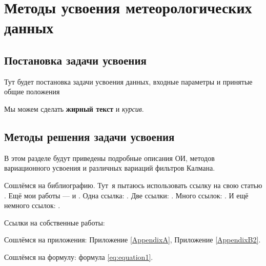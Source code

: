 \chapter{Методы усвоения метеорологических данных} \label{chapt1}

\section{Постановка задачи усвоения} \label{sect1_1}
Тут будет постановка задачи усвоения данных, входные параметры и принятые общие положения

Мы можем сделать \textbf{жирный текст} и \textit{курсив}.

\section{Методы решения задачи усвоения} \label{sect1_2}

В этом разделе будут приведены подробные описания ОИ, методов вариационного усвоения и различных вариаций фильтров Калмана.

Сошлёмся на библиографию. Тут~я пытаюсь использовать ссылку на свою статью \cite{vak-Mizyak-2013}. Ещё мои работы --- \cite{vak-Slyaeva-2013} и \cite{Tolstykh-2015}. 
Одна ссылка: \cite[с.~54]{Ipatova-2013}\cite[с.~36]{WMO-CBS}. Две ссылки: \cite{Ipatova-2013,Tolstykh-SLAV}. Много ссылок:  \cite[с.~54]{Management,Borozda} \cite{Management,Borozda,Marketing,Constitution,FamilyCode,Gost.7.0.53,Razumovski,Lagkueva,Methodology,Encyclopedia,Kriger}. И ещё немного ссылок: \cite{Article,Book,Booklet,Conference,Inbook,Incollection,Manual,Mastersthesis,Misc,Phdthesis,Proceedings,Techreport,Unpublished}. \cite{medvedev2006jelektronnye, CEAT:CEAT581, doi:10.1080/01932691.2010.513279,Gosele1999161,Li2007StressAnalysis, Shoji199895,test:eisner-sample,AB_patent_Pomerantz_1968,iofis_patent1960}



Ссылки на собственные работы:~\cite{vak-Mizyak-2013, vak-Shlyaeva-2013}

Сошлёмся на приложения: Приложение \ref{AppendixA}, Приложение \ref{AppendixB2}.

Сошлёмся на формулу: формула \eqref{eq:equation1}.

